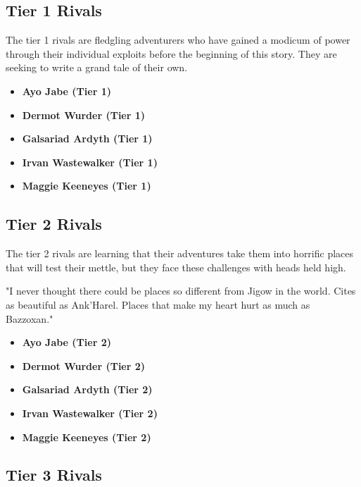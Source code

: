 \documentclass[letterpaper, 11pt, bg=full, twocolumn]{dndbook}
\begin{document}
\subsection{Tier 1 Rivals}


The tier 1 rivals are fledgling adventurers who have gained a modicum of power through their individual exploits before the beginning of this story. They are seeking to write a grand tale of their own.

\begin{itemize}
\item \textbf{Ayo Jabe (Tier 1)}
\item \textbf{Dermot Wurder (Tier 1)}
\item \textbf{Galsariad Ardyth (Tier 1)}
\item \textbf{Irvan Wastewalker (Tier 1)}
\item \textbf{Maggie Keeneyes (Tier 1)}
\end{itemize}

\subsection{Tier 2 Rivals}

The tier 2 rivals are learning that their adventures take them into horrific places that will test their mettle, but they face these challenges with heads held high.

\begin{DndReadAloud}
"I never thought there could be places so different from Jigow in the world. Cites as beautiful as Ank'Harel. Places that make my heart hurt as much as Bazzoxan."
\end{DndReadAloud}

\begin{itemize}
\item \textbf{Ayo Jabe (Tier 2)}
\item \textbf{Dermot Wurder (Tier 2)}
\item \textbf{Galsariad Ardyth (Tier 2)}
\item \textbf{Irvan Wastewalker (Tier 2)}
\item \textbf{Maggie Keeneyes (Tier 2)}
\end{itemize}

\subsection{Tier 3 Rivals}
\end{document}
